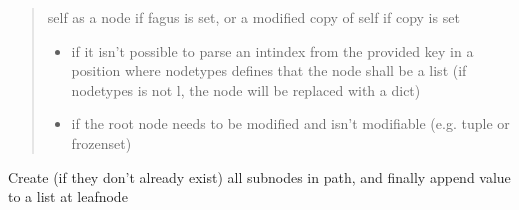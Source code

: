 \documentclass[a4paper,10pt,english]{sphinxmanual}
\begin{document}
\begin{fulllineitems}
\begin{fulllineitems}
\begin{quote}
\begin{description}
\begin{itemize}
\end{itemize}

\sphinxAtStartPar
self as a node if fagus is set, or a modified copy of self if copy is set

\begin{itemize}
\item {}
\sphinxAtStartPar
{} \textendash{} if it isn’t possible to parse an int\sphinxhyphen{}index from the provided key in a position where node\sphinxhyphen{}types
    defines that the node shall be a list (if node\sphinxhyphen{}types is not l, the node will be replaced with a dict)

\item {}
\sphinxAtStartPar
{} \textendash{} if the root node needs to be modified and isn’t modifiable (e.g. tuple or frozenset)

\end{itemize}

\end{description}\end{quote}

\end{fulllineitems}


\begin{fulllineitems}
\label{\detokenize{fagus:fagus.Fagus.append}}
\pysigstartsignatures
{}
\pysigstopsignatures
\sphinxAtStartPar
Create (if they don’t already exist) all sub\sphinxhyphen{}nodes in path, and finally append value to a list at leaf\sphinxhyphen{}node


\end{fulllineitems}
\end{fulllineitems}
\end{document}
